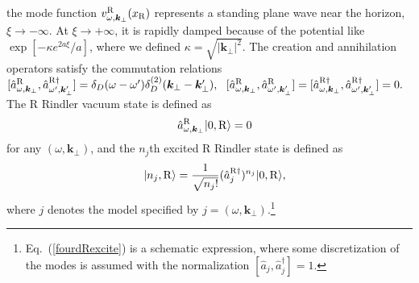 \documentclass[aps,prd,preprintnumbers,nofootinbib,showpacs,11pt]{revtex4}%
\begin{document}
\begin{widetext}
the mode function $v_{\omega,{\bm k}_\perp}^{\rm R}(x_{\rm R})$ represents 
a standing plane wave near the horizon, $\xi \rightarrow -\infty$. At $\xi \rightarrow +\infty$, 
it is rapidly damped because of the potential like $ \exp[-\kappa e^{2a\xi}/a]$, 
where we defined $\kappa=\sqrt{|\bm k_\perp|^2}$. 
The creation and annihilation operators satisfy the commutation relations
$
[{\hat a}^{\rm R}_{\omega,\bm k_\perp}, {\hat a}_{\omega',\bm k_\perp'}^{\rm R \dagger}]
=\delta_D(\omega-\omega') \delta_D^{(2)}(\bm k_\perp-\bm k_\perp'), 
~~
[{\hat a}^{\rm R}_{\omega,\bm k_\perp}, {\hat a}_{\omega',\bm k_\perp'}^{\rm R}]
=[{\hat a}^{\rm R \dagger}_{\omega,\bm k_\perp}, {\hat a}_{\omega',\bm k_\perp'}^{\rm R \dagger}]
=0.
$
The R Rindler vacuum state is defined as 
\begin{eqnarray}
&&
\hat a_{\omega,\bm k_\perp}^{\rm R} |0,{\rm R}\rangle=0
\label{fourdRvauum}
\end{eqnarray}
for any $(\omega, \bm k_\perp)$, and the $n_j$th excited R Rindler state is defined as 
\begin{eqnarray}
  &&|n_j,{\rm R}\rangle={1\over\sqrt{n_j!}}(\hat a_{j}^{\rm R \dagger})^{n_j}|0,{\rm R}\rangle,
\label{fourdRexcite}
\end{eqnarray}
where $j$ denotes the model specified by $j=(\omega,\bm k_\perp)$.\footnote{
Eq.~(\ref{fourdRexcite}) is a schematic expression, where some discretization of 
the modes is assumed with the normalization $[\hat a_j,\hat a_j^\dagger]=1$.}


\end{widetext}
\end{document}
